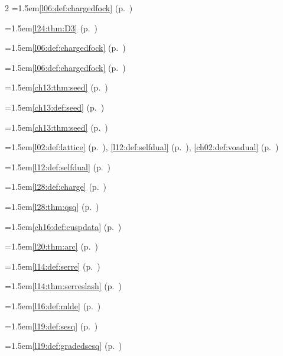 \begin{multicols}{2}
\hangindent=1.5em\quad \ref{l06:def:chargedfock} (p.~\pageref{l06:def:chargedfock})\par
\hangindent=1.5em\quad \ref{l24:thm:D3} (p.~\pageref{l24:thm:D3})\par
\hangindent=1.5em\quad \ref{l06:def:chargedfock} (p.~\pageref{l06:def:chargedfock})\par
\hangindent=1.5em\quad \ref{l06:def:chargedfock} (p.~\pageref{l06:def:chargedfock})\par
\hangindent=1.5em\quad \ref{ch13:thm:seed} (p.~\pageref{ch13:thm:seed})\par
\hangindent=1.5em\quad \ref{ch13:def:seed} (p.~\pageref{ch13:def:seed})\par
\hangindent=1.5em\quad \ref{ch13:thm:seed} (p.~\pageref{ch13:thm:seed})\par
\hangindent=1.5em\quad \ref{l02:def:lattice} (p.~\pageref{l02:def:lattice}), \ref{l12:def:selfdual} (p.~\pageref{l12:def:selfdual}), \ref{ch02:def:voadual} (p.~\pageref{ch02:def:voadual})\par
\hangindent=1.5em\quad \ref{l12:def:selfdual} (p.~\pageref{l12:def:selfdual})\par
\hangindent=1.5em\quad \ref{l28:def:charge} (p.~\pageref{l28:def:charge})\par
\hangindent=1.5em\quad \ref{l28:thm:qsq} (p.~\pageref{l28:thm:qsq})\par
\hangindent=1.5em\quad \ref{ch16:def:cuspdata} (p.~\pageref{ch16:def:cuspdata})\par
\hangindent=1.5em\quad \ref{l20:thm:arc} (p.~\pageref{l20:thm:arc})\par
\hangindent=1.5em\quad \ref{l14:def:serre} (p.~\pageref{l14:def:serre})\par
\hangindent=1.5em\quad \ref{l14:thm:serreslash} (p.~\pageref{l14:thm:serreslash})\par
\hangindent=1.5em\quad \ref{l16:def:mlde} (p.~\pageref{l16:def:mlde})\par
\hangindent=1.5em\quad \ref{l19:def:sesq} (p.~\pageref{l19:def:sesq})\par
\hangindent=1.5em\quad \ref{l19:def:gradedsesq} (p.~\pageref{l19:def:gradedsesq})\par

\end{multicols}
